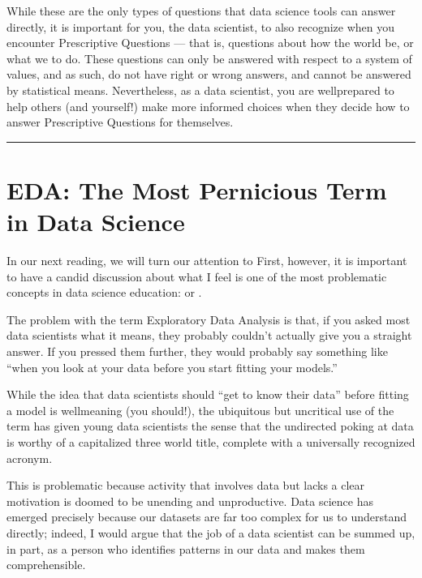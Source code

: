 \documentclass[letterpaper,10pt,english]{jupyterBook}
\begin{document}
\sphinxAtStartPar
While these are the only types of questions that data science tools can answer directly, it is important for you, the data scientist, to also recognize when you encounter Prescriptive Questions — that is, questions about how the world  be, or what we  to do. These questions can only be answered with respect to a system of values, and as such, do not have right or wrong answers, and cannot be answered by statistical means. Nevertheless, as a data scientist, you are well\sphinxhyphen{}prepared to help others (and yourself!) make more informed choices when they decide how to answer Prescriptive Questions for themselves.


\bigskip\hrule\bigskip


\sphinxstepscope


\chapter{EDA: The Most Pernicious Term in Data Science}
\label{\detokenize{30_questions/07_eda:eda-the-most-pernicious-term-in-data-science}}\label{\detokenize{30_questions/07_eda::doc}}
\sphinxAtStartPar
In our next reading, we will turn our attention to  First, however, it is important to have a candid discussion about what I feel is one of the most problematic concepts in data science education:  or .

\sphinxAtStartPar
The problem with the term Exploratory Data Analysis is that, if you asked most data scientists what it means, they probably couldn’t actually give you a straight answer. If you pressed them further, they would probably say something like “when you look at your data before you start fitting your models.”

\sphinxAtStartPar
While the idea that data scientists should “get to know their data” before fitting a model is well\sphinxhyphen{}meaning (you  should!), the ubiquitous but uncritical use of the term has given young data scientists the sense that the undirected poking at data is worthy of a capitalized three world title, complete with a universally recognized acronym.

\sphinxAtStartPar
This is problematic because  activity that involves data but lacks a clear motivation is doomed to be unending and unproductive. Data science has emerged precisely because our datasets are far too complex for us to understand directly; indeed, I would argue that the job of a data scientist can be summed up, in part, as a person who identifies  patterns in our data and makes them comprehensible.
\end{document}
